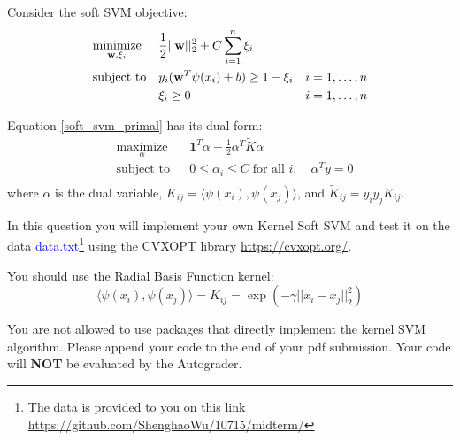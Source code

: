 
Consider the soft SVM objective:
\begin{equation}
\label{soft_svm_primal}
\begin{aligned}
& \underset{\mathbf{w}, \xi_i}{\text{minimize}} && \frac{1}{2}||\mathbf{w}||_2^2 + C\sum_{i=1}^n\xi_i\\
& \text{subject to} && y_i(\mathbf{w}^T\psi(x_i) + b) \geq 1-\xi_i & i = 1,\ldots, n\\
& && \xi_i \geq 0 & i = 1,\ldots, n
\end{aligned}
\end{equation}

Equation \ref{soft_svm_primal} has its dual form:
\begin{equation}
\label{soft_svm_dual}
\begin{aligned} 
  & \underset{\alpha}{\text{maximize}} && \mathbf{1}^T\alpha - \frac{1}{2}\alpha^T \tilde{K}\alpha \\
  & \text{subject to} && 0\leq \alpha_i\leq C \; \text{for all } i, \quad \alpha^Ty = 0\\
\end{aligned}
\end{equation}
where $\alpha$ is the dual variable, $K_{ij} = \langle\psi(x_i), \psi(x_j)\rangle$, and $\tilde{K}_{ij} = y_iy_jK_{ij}$.

\vspace{5 mm}
In this question you will implement your own Kernel Soft SVM and test it on the data \textcolor{blue}{data.txt}\footnote{The data is provided to you on this link \url{https://github.com/ShenghaoWu/10715/midterm/}} using the CVXOPT library \url{https://cvxopt.org/}.

You should use the Radial Basis Function kernel:
$$\langle \psi(x_i), \psi(x_j) \rangle = K_{ij} = \exp\left(-\gamma||x_i - x_j||_2^2\right)$$



You are not allowed to use packages that directly implement the kernel SVM algorithm. Please append your code to the end of your pdf submission. Your code will \textbf{NOT} be evaluated by the Autograder.

\vspace{5mm}

